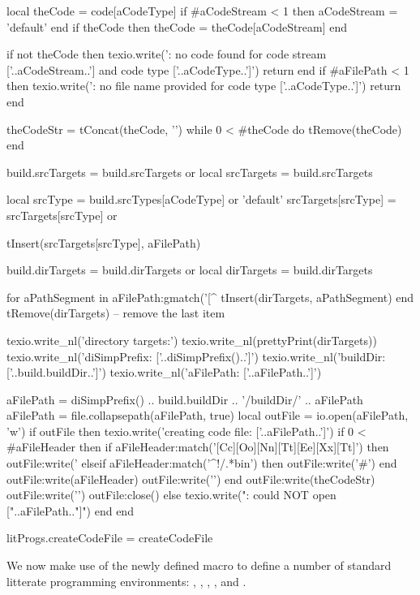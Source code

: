   local theCode = code[aCodeType]
  if #aCodeStream < 1 then aCodeStream = 'default' end
  if theCode then theCode = theCode[aCodeStream] end

  if not theCode then
    texio.write('\nERROR: no code found for code stream ['..aCodeStream..'] and code type ['..aCodeType..']\n\n')
    return
  end
  if #aFilePath < 1 then
    texio.write('\nERROR: no file name provided for code type ['..aCodeType..']\n\n')
    return
  end

  theCodeStr = tConcat(theCode, '\n\n')
  while 0 < #theCode do tRemove(theCode) end

  build.srcTargets = build.srcTargets or { }
  local srcTargets = build.srcTargets

  local srcType       = build.srcTypes[aCodeType] or 'default'
  srcTargets[srcType] = srcTargets[srcType] or { }

  tInsert(srcTargets[srcType], aFilePath)

  build.dirTargets = build.dirTargets or { }
  local dirTargets = build.dirTargets
  
  for aPathSegment in aFilePath:gmatch('[^%
    tInsert(dirTargets, aPathSegment)
  end
  tRemove(dirTargets) -- remove the last item
  
  texio.write_nl('directory targets:')
  texio.write_nl(prettyPrint(dirTargets))
  texio.write_nl('diSimpPrefix: ['..diSimpPrefix()..']')
  texio.write_nl('buildDir: ['..build.buildDir..']')
  texio.write_nl('aFilePath: ['..aFilePath..']')

  aFilePath = diSimpPrefix() .. build.buildDir .. '/buildDir/' .. aFilePath
  aFilePath = file.collapsepath(aFilePath, true)
  local outFile = io.open(aFilePath, 'w')
  if outFile then
    texio.write('creating code file: ['..aFilePath..']\n')
    if 0 < #aFileHeader then
      if aFileHeader:match('[Cc][Oo][Nn][Tt][Ee][Xx][Tt]') then
        outFile:write('%
      elseif aFileHeader:match('^!/.*bin') then
        outFile:write('#')
      end
      outFile:write(aFileHeader)
      outFile:write('\n\n')
    end
    outFile:write(theCodeStr)
    outFile:write('\n\n')
    outFile:close()
  else
    texio.write("\nERROR: could NOT open ["..aFilePath.."]\n")
  end
end

litProgs.createCodeFile = createCodeFile
\stopLuaCode

\stopTestSuite

We now make use of the newly defined  macro to 
define a number of standard litterate programming environments: 
, , , , 
 and . 

